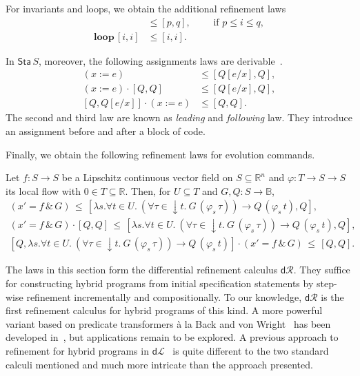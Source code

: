 \documentclass[envcountsame,envcountsect]{llncs}
\newcommand{\dL}{\mathsf{d}\mathcal{L}}
\newcommand{\dR}{\mathsf{d}\mathcal{R}}
\newcommand{\flow}{\varphi}
\newcommand{\reals}{\mathbb{R}}
\newcommand{\bools}{\mathbb{B}}
\newcommand{\sta}{\mathsf{Sta}}
\begin{document}
For invariants and loops, we obtain the additional refinement laws
\begin{align}
  [i,i] &\le [p,q],\qquad \text{ if } p\le i \le q,\label{eq:r-inv}\tag{r-inv}\\
\mathbf{loop}\, [i,i] &\le [i,i]. \label{eq:r-loop}\tag{r-loop}
\end{align}

In $\sta\, S$, moreover, the following assignments laws are
derivable~\cite{ArmstrongGS16}.
\begin{align}
 (x := e)  &\le  \left[Q[e/x],Q\right],\label{eq:r-assgn}\tag{r-assgn}\\
(x:= e) \cdot \left[Q,Q\right] &\le [Q[e/x],Q],\label{eq:r-assgn}\tag{r-assgnl}\\
\left[Q,Q[e/x]\right]\cdot (x:=e) &\le [Q,Q]. \label{eq:r-assgn}\tag{r-assgnf}
\end{align}
The second and third law are known as \emph{leading} and \emph{following}
law. They introduce an assignment before and after a block of code. 

Finally, we obtain the following refinement laws for evolution
commands.
\begin{lemma}\label{P:r-evl-lemma}
  Let $f:S\to S$ be a Lipschitz continuous vector field on
  $S\subseteq \reals^n$ and $\flow:T\to S\to S$ its local flow with
  $0\in T\subseteq \reals$. Then, for $U\subseteq T$ and
  $G,Q:S\to\bools$,
\begin{gather*}
(x' = f\, \&\, G)\, \le\, [\lambda s.\forall t\in U.\ (\forall
\tau\in {\downarrow}t.\ G\, (\flow_s\, \tau))\to Q\, (\flow_s\, t),Q],\label{eq:r-evl}\tag{r-evl}\\
(x' = f\, \&\, G) \cdot \left[Q,Q\right]\, \le\, [\lambda s. \forall t\in U.\ (\forall
\tau\in {\downarrow}t.\ G\, (\flow_s\, \tau))\to Q\, (\flow_s\, t),Q],\label{eq:r-evll}\tag{r-evll}\\
\left[Q,\lambda s. \forall t\in U.\ (\forall
\tau\in {\downarrow}t.\ G\, (\flow_s\, \tau))\to Q\, (\flow_s\,
t)\right]\cdot (x' = f\, \&\, G) \, \le \, [Q,Q].\label{eq:r-evlr}\tag{r-evlr}
\end{gather*}
\end{lemma}

The laws in this section form the differential refinement calculus
$\dR$.  They suffice for constructing hybrid programs from initial
specification statements by step-wise refinement incrementally and
compositionally. To our knowledge, $\dR$ is the first refinement
calculus for hybrid programs of this kind.  A more powerful variant
based on predicate transformers \`a la Back and von
Wright~\cite{BackW98} has been developed in~\cite{MuniveS19}, but
applications remain to be explored.  A previous approach to refinement
for hybrid programs in $\dL$~\cite{LoosP16} is quite different to the
two standard calculi mentioned and much more intricate than the
approach presented.
\end{document}

